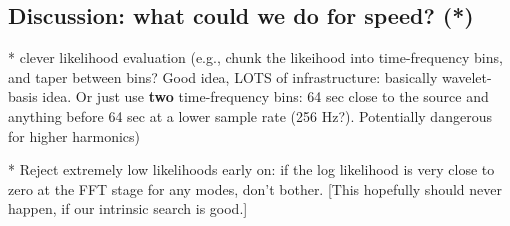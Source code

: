 \documentclass[twocolumn,prd,nofootinbib]{revtex4}
\begin{document}
\subsection{Discussion: what could we do for speed? (*)}


* clever likelihood evaluation (e.g., chunk the likeihood into time-frequency bins, and taper between bins? Good idea,
LOTS of infrastructure: basically wavelet-basis idea.  Or just use \textbf{two} time-frequency bins: 64 sec close to the
source and anything before 64 sec at a lower sample rate (256 Hz?).  Potentially dangerous for higher harmonics)

* Reject extremely low likelihoods early on: if the log likelihood is very close to zero at the FFT stage for any modes,
don't bother.  [This hopefully should never happen, if our intrinsic search is good.]
\end{document}
